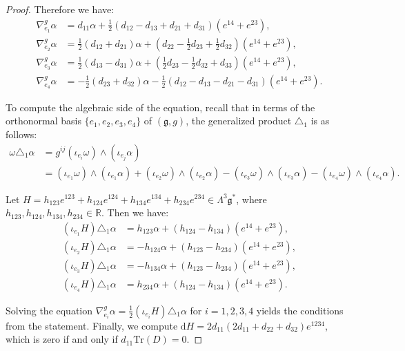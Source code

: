 \documentclass[10pt,a4paper]{amsart}
\newcommand{\R}{\mathbb{R}}
\newcommand{\Tr}{\mathrm{Tr}}
\renewcommand{\d}{\mathrm{d}}
\begin{document}
\begin{proof}
    Therefore we have: \begin{align*}
        \nabla^g_{e_1}\alpha&=d_{11}\alpha+\tfrac{1}{2}(d_{12}-d_{13}+d_{21}+d_{31})(e^{14}+e^{23}),\\
        \nabla^g_{e_2}\alpha&=\tfrac{1}{2}(d_{12}+d_{21})\alpha+(d_{22}-\tfrac{1}{2}d_{23}+\tfrac{1}{2}d_{32})(e^{14}+e^{23}),\\
        \nabla^g_{e_3}\alpha&=\tfrac{1}{2}(d_{13}-d_{31})\alpha+(\tfrac{1}{2}d_{23}-\tfrac{1}{2}d_{32}+d_{33})(e^{14}+e^{23}),\\
        \nabla^g_{e_4}\alpha&=-\tfrac{1}{2}(d_{23}+d_{32})\alpha-\tfrac{1}{2}(d_{12}-d_{13}-d_{21}-d_{31})(e^{14}+e^{23}).
    \end{align*}

    To compute the algebraic side of the equation, recall that in terms of the orthonormal basis $\{e_1,e_2,e_3,e_4\}$ of $(\mathfrak{g},g)$, the generalized product $\triangle_1$ is as follows: \begin{align*}
        \omega\triangle_1\alpha&=g^{ij}(\iota_{e_i}\omega)\wedge(\iota_{e_j}\alpha)\\
        &=(\iota_{e_1}\omega)\wedge(\iota_{e_1}\alpha)+(\iota_{e_2}\omega)\wedge(\iota_{e_2}\alpha)-(\iota_{e_3}\omega)\wedge(\iota_{e_3}\alpha)-(\iota_{e_4}\omega)\wedge(\iota_{e_4}\alpha).
    \end{align*}
    
    Let $H=h_{123}e^{123}+h_{124}e^{124}+h_{134}e^{134}+h_{234}e^{234}\in\Lambda^3\mathfrak{g}^*$, where $h_{123},h_{124},h_{134},h_{234}\in\R$. Then we have: \begin{align*}
        (\iota_{e_1}H)\triangle_1\alpha&=h_{123}\alpha+(h_{124}-h_{134})(e^{14}+e^{23}),\\
        (\iota_{e_2}H)\triangle_1\alpha&=-h_{124}\alpha+(h_{123}-h_{234})(e^{14}+e^{23}),\\
        (\iota_{e_3}H)\triangle_1\alpha&=-h_{134}\alpha+(h_{123}-h_{234})(e^{14}+e^{23}),\\
        (\iota_{e_4}H)\triangle_1\alpha&=h_{234}\alpha+(h_{124}-h_{134})(e^{14}+e^{23}).
    \end{align*}

    Solving the equation $\nabla^g_{e_i}\alpha=\tfrac{1}{2}(\iota_{e_i}H)\triangle_1\alpha$ for $i=1,2,3,4$ yields the conditions from the statement. Finally, we compute $\d H=2d_{11}(2d_{11}+d_{22}+d_{32})e^{1234}$, which is zero if and only if $d_{11}\Tr(D)=0$.
\end{proof}
\end{document}
